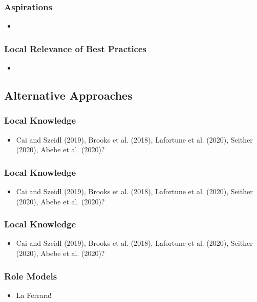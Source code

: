 \documentclass[10pt]{beamer}
\begin{document}
\begin{frame}
\frametitle{Aspirations}
	\begin{itemize}
	\item 
	\vspace{0.1in}
	\end{itemize}
\end{frame}

\begin{frame}
\frametitle{Local Relevance of Best Practices}
	\begin{itemize}
	\item 
	\vspace{0.1in}
	\end{itemize}
\end{frame}


\subsection{Alternative Approaches}

\begin{frame}
\frametitle{Local Knowledge}
	\begin{itemize}
	\item Cai and Szeidl (2019), Brooks et al. (2018), Lafortune et al. (2020), Seither (2020), Abebe et al. (2020)?
	\vspace{0.1in}
	\end{itemize}
\end{frame}

\begin{frame}
\frametitle{Local Knowledge}
	\begin{itemize}
	\item Cai and Szeidl (2019), Brooks et al. (2018), Lafortune et al. (2020), Seither (2020), Abebe et al. (2020)?
	\vspace{0.1in}
	\end{itemize}
\end{frame}

\begin{frame}
\frametitle{Local Knowledge}
	\begin{itemize}
	\item Cai and Szeidl (2019), Brooks et al. (2018), Lafortune et al. (2020), Seither (2020), Abebe et al. (2020)?
	\vspace{0.1in}
	\end{itemize}
\end{frame}


\begin{frame}
\frametitle{Role Models}
	\begin{itemize}
	\item La Ferrara!
	\vspace{0.1in}
	\end{itemize}
\end{frame}
\end{document}
